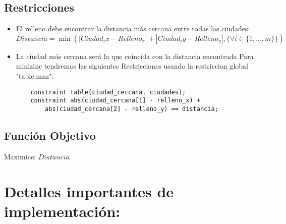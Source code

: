 \documentclass{article}
\begin{document}
\subsection{Restricciones}
\begin{itemize}
    \item El relleno debe encontrar la distancia más cercana entre todas las ciudades:
    $Distancia = \min( |Ciudad_ix - Relleno_x| + |Ciudad_iy - Relleno_y|, \{ \forall i \in \{1,...,m\} \})$
    \item La ciudad más cercana será la que coincida con la distancia encontrada
    Para minizinc tendremos las siguientes Restricciones usando la restriccion global "table.mzn":
    \begin{lstlisting}
    constraint table(ciudad_cercana, ciudades);
    constraint abs(ciudad_cercana[1] - relleno_x) +
        abs(ciudad_cercana[2] - relleno_y) == distancia;
    \end{lstlisting}
\end{itemize}

\subsection{Función Objetivo}
Maximice: $Distancia$

\section{Detalles importantes de implementación:}
\end{document}
